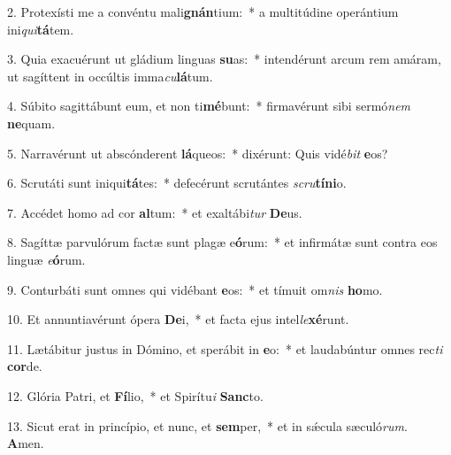 2. Protexísti me a convéntu mali\textbf{gnán}tium:~*  a multitúdine operántium ini\textit{qui}\textbf{tá}tem.\

3. Quia exacuérunt ut gládium linguas \textbf{su}as:~*  intendérunt arcum rem amáram, ut sagíttent in occúltis imma\textit{cu}\textbf{lá}tum.\

4. Súbito sagittábunt eum, et non ti\textbf{mé}bunt:~*  firmavérunt sibi sermó\textit{nem} \textbf{ne}quam.\

5. Narravérunt ut abscónderent \textbf{lá}queos:~*  dixérunt: Quis vidé\textit{bit} \textbf{e}os?\

6. Scrutáti sunt iniqui\textbf{tá}tes:~*  defecérunt scrutántes \textit{scru}\textbf{tí}\textbf{ni}o.\

7. Accédet homo ad cor \textbf{al}tum:~*  et exaltábi\textit{tur} \textbf{De}us.\

8. Sagíttæ parvulórum factæ sunt plagæ e\textbf{ó}rum:~*  et infirmátæ sunt contra eos linguæ \textit{e}\textbf{ó}rum.\

9. Conturbáti sunt omnes qui vidébant \textbf{e}os:~*  et tímuit om\textit{nis} \textbf{ho}mo.\

10. Et annuntiavérunt ópera \textbf{De}i,~*  et facta ejus intel\textit{le}\textbf{xé}runt.\

11. Lætábitur justus in Dómino, et sperábit in \textbf{e}o:~*  et laudabúntur omnes rec\textit{ti} \textbf{cor}de.\

12. Glória Patri, et \textbf{Fí}lio,~*  et Spirítu\textit{i} \textbf{Sanc}to.\

13. Sicut erat in princípio, et nunc, et \textbf{sem}per,~*  et in sǽcula sæculó\textit{rum}. \textbf{A}men.\

